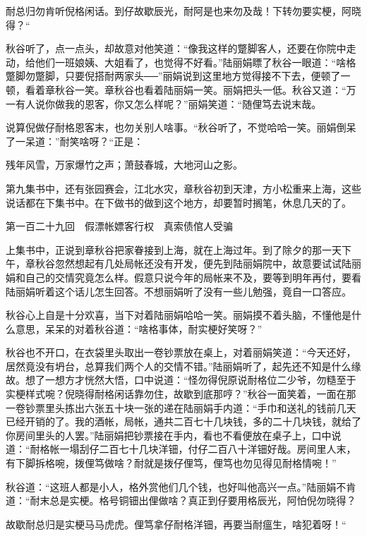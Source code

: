 \documentclass[12pt,UTF8]{ctexbook}
\begin{document}
{{{耐总归勿肯听倪格闲话。到仔故歇辰光，耐阿是也来勿及哉！下转勿要实梗，阿晓得？“

秋谷听了，点一点头，却故意对他笑道：“像我这样的蹩脚客人，还要在你院中走动，给他们一班娘姨、大姐看了，也觉得不好看。”陆丽娟瞟了秋谷一眼道：“啥格蹩脚勿蹩脚，只要倪搭耐两家头──”丽娟说到这里地方觉得接不下去，便顿了一顿，看着章秋谷一笑。章秋谷也看着陆丽娟一笑。丽娟把头一低。秋谷又道：“万一有人说你做我的恩客，你又怎么样呢？”丽娟笑道：“随俚笃去说末哉。

说算倪做仔耐格恩客末，也勿关别人啥事。“秋谷听了，不觉哈哈一笑。丽娟倒呆了一呆道：”耐笑啥呀？“正是：

残年风雪，万家爆竹之声；萧鼓春城，大地河山之影。

第九集书中，还有张园赛会，江北水灾，章秋谷初到天津，方小松重来上海，这些说话都在下集书中。在下做书的做到这个地方，却要暂时搁笔，休息几天的了。





第一百二十九回　假漂帐嫖客行权　真索债倌人受骗





上集书中，正说到章秋谷把家眷接到上海，就在上海过年。到了除夕的那一天下午，章秋谷忽然想起有几处局帐还没有开发，便先到陆丽娟院中，故意要试试陆丽娟和自己的交情究竟怎么样。假意只说今年的局帐来不及，要等到明年再付，要看陆丽娟听着这个话儿怎生回答。不想丽娟听了没有一些儿勉强，竟自一口答应。

秋谷心上自是十分欢喜，当下对着陆丽娟哈哈一笑。丽娟摸不着头脑，不懂他是什么意思，呆呆的对着秋谷道：“啥格事体，耐实梗好笑呀？”

秋谷也不开口，在衣袋里头取出一卷钞票放在桌上，对着丽娟笑道：“今天还好，居然竟没有坍台，总算我们两个人的交情不错。”陆丽娟听了，起先还不知是什么缘故。想了一想方才恍然大悟，口中说道：“怪勿得倪原说耐格位二少爷，勿糙至于实梗样式啘？倪晓得耐格闲话靠勿住，故歇到底那哼？”秋谷一面笑着，一面在那一卷钞票里头拣出六张五十块一张的递在陆丽娟手内道：“手巾和送礼的钱前几天已经开销的了。我的酒帐，局帐，通共二百七十几块钱，多的二十几块钱，就给了你房间里头的人罢。”陆丽娟把钞票接在手内，看也不看便放在桌子上，口中说道：“耐格帐一塌刮仔二百七十几块洋钿，付仔二百八十洋钿好哉。房间里人末，有下脚拆格啘，拨俚笃做啥？耐就是拨仔俚笃，俚笃也勿见得见耐格情啘！”

秋谷道：“这班人都是小人，格外赏他们几个钱，也好叫他高兴一点。”陆丽娟不肯道：“耐末总是实梗。格号铜钿出俚做啥？真正到仔要用格辰光，阿怕倪勿晓得？

故歇耐总归是实梗马马虎虎。俚笃拿仔耐格洋钿，再要当耐瘟生，啥犯着呀！“

}}}
\end{document}
